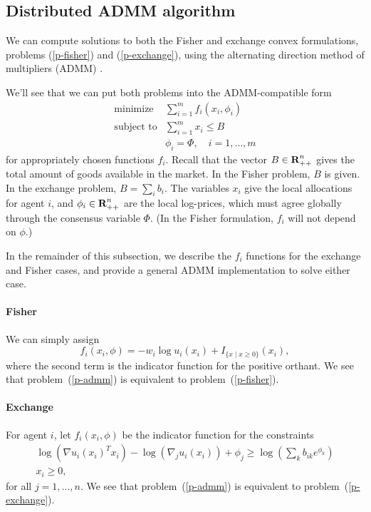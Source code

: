 \documentclass[12pt]{article}
\begin{document}
\subsection{Distributed ADMM algorithm}
\label{sec:distributed}

We can compute solutions to both the Fisher and exchange convex
formulations, problems (\ref{p-fisher}) and (\ref{p-exchange}), using
the alternating direction method of multipliers (ADMM) \cite{boyd2011distributed, parikh2013proximal}.

We'll see that we can put both problems into the ADMM-compatible form
\begin{equation}
\label{p-admm}
\begin{array}{ll}
\mbox{minimize} & \sum_{i=1}^m f_i(x_i, \phi_i) \\
\mbox{subject to} & \sum_{i=1}^m x_i \leq B\\
& \phi_i = \Phi, \quad i=1,\ldots,m
\end{array}
\end{equation}
for appropriately chosen functions $f_i$.
Recall that the vector $B \in {\mbox{\bf R}}^n_{++}$ gives the total
amount of goods available in the market. In the Fisher problem,
$B$ is given.
In the exchange problem, $B = \sum_i b_i$.
The variables $x_i$ give the local allocations for agent $i$, and
$\phi_i \in {\mbox{\bf R}}^n_{++}$
are the local log-prices, which must agree globally through the
consensus variable $\Phi$.
(In the Fisher formulation, $f_i$ will not depend on $\phi$.)

In the remainder of this subsection, we describe the $f_i$ functions for the exchange and Fisher cases, and provide a general
ADMM implementation to solve either case.

\paragraph{Fisher}
We can simply assign
\[
f_i(x_i, \phi) = -w_i \log u_i(x_i) + I_{\lbrace x \mid x \geq 0 \rbrace}(x_i),
\]
where the second term is the indicator function for the positive orthant.
We see that problem~(\ref{p-admm}) is equivalent to
problem~(\ref{p-fisher}).

\paragraph{Exchange}

For agent $i$, let $f_i(x_i, \phi)$ be the indicator function for the
constraints
\[
\begin{array}{c}
\log(\nabla u_i(x_i)^T x_i) - \log(\nabla_j u_i(x_i)) + \phi_j \geq  \log\left(\sum_k b_{ik} e^{\phi_{k}}\right)\\
x_i \geq 0,
\end{array}
\]
for all $j=1,\ldots,n$.
We see that problem~(\ref{p-admm}) is equivalent to problem~(\ref{p-exchange}).
\end{document}
